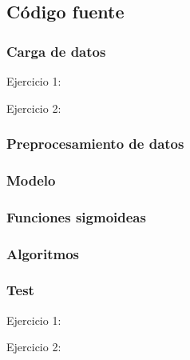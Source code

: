 \documentclass[10pt, a4paper, spanish]{article}
\begin{document}

\newpage
 

\newpage 

\subsection{Código fuente}

\subsubsection*{Carga de datos}

Ejercicio 1:



Ejercicio 2:



\subsubsection*{Preprocesamiento de datos}



\subsubsection*{Modelo}



\subsubsection*{Funciones sigmoideas}



\subsubsection*{Algoritmos}



\subsubsection*{Test}

Ejercicio 1:



Ejercicio 2:


\end{document}
